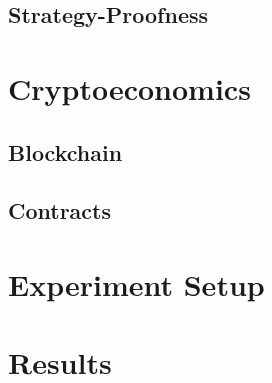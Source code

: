 \documentclass[preprint,twoside,11pt]{article}
\begin{document}
\subsection{Strategy-Proofness}

\section{Cryptoeconomics}

\subsection{Blockchain}

\subsection{Contracts}

\section{Experiment Setup}

\section{Results}


\newpage

\appendix
\end{document}

